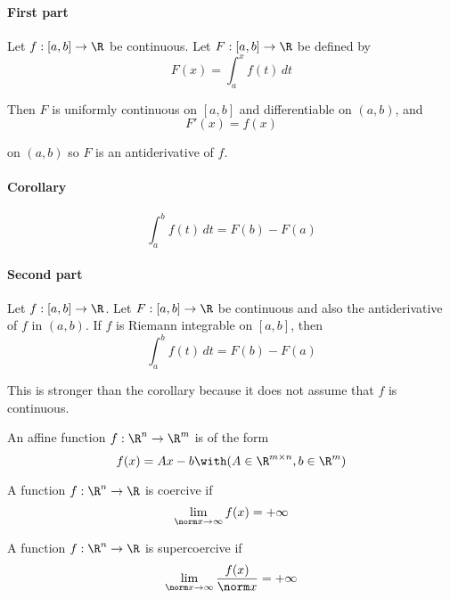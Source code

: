 \paragraph{First part} Let $f:[a,b]\to\R$ be continuous. Let $F:[a,b]\to\R$ be defined by
$$F(x)=\int_a^xf(t)\,dt$$

Then $F$ is uniformly continuous on $[a,b]$ and differentiable on $(a,b)$, and
$$F'(x)=f(x)$$

on $(a,b)$ so $F$ is an antiderivative of $f$.

\paragraph{Corollary}
$$\int_a^bf(t)\,dt=F(b)-F(a)$$

\paragraph{Second part} Let $f:[a,b]\to\R$. Let $F:[a,b]\to\R$ be continuous and also the
antiderivative of $f$ in $(a,b)$. If $f$ is Riemann integrable on $[a,b]$, then
$$\int_a^bf(t)\,dt=F(b)-F(a)$$

This is stronger than the corollary because it does not assume that $f$ is
continuous.


\label{dcb7f73}

An affine function $f:\R^n\to\R^m$ is of the form
$$
  f(x)=Ax-b\with(A\in\R^{m\times n},b\in\R^m)
$$

\label{e9c7871}

A function $f:\R^n\to\R$ is coercive if
$$
  \lim_{\norm x\to\infty}f(x)=+\infty
$$

\label{a0444cc}

A function $f:\R^n\to\R$ is supercoercive if
$$
  \lim_{\norm x\to\infty}\frac{f(x)}{\norm x}=+\infty
$$


\label{d8bd136}

